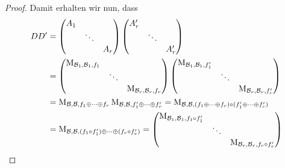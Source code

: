 \documentclass[a4paper,10pt]{scrartcl}
\begin{document}
\begin{proof}
  Damit erhalten wir nun, dass
  \begin{align*}
          D D'
    &=  \begin{pmatrix}
          A_1 &         &     \\
              & \ddots  &     \\
              &         & A_r
        \end{pmatrix}
        \begin{pmatrix}
          A'_r  &         &       \\
                & \ddots  &       \\
                &         & A'_r
        \end{pmatrix}
    \\
    &=  \begin{pmatrix}
          \repmatrix{\basis{B}_1}{\basis{B}_1}{f_1} &         &     \\
                                                    & \ddots  &     \\
                                                    &         & \repmatrix{\basis{B}_r}{\basis{B}_r}{f_r}
        \end{pmatrix}
        \begin{pmatrix}
          \repmatrix{\basis{B}_1}{\basis{B}_1}{f'_1}  &         &     \\
                                                      & \ddots  &     \\
                                                      &         & \repmatrix{\basis{B}_r}{\basis{B}_r}{f'_r}
        \end{pmatrix}
    \\
    &=  \repmatrix{\basis{B}}{\basis{B}}{f_1 \oplus \dotsb \oplus f_r}
        \repmatrix{\basis{B}}{\basis{B}}{f'_1 \oplus \dotsb \oplus f'_r}
      = \repmatrix{\basis{B}}{\basis{B}}{(f_1 \oplus \dotsb \oplus f_r) \circ (f'_1 \oplus \dotsb \oplus f'_r)}
    \\
    &=  \repmatrix{\basis{B}}{\basis{B}}{(f_1 \circ f'_1) \oplus \dotsb \oplus (f_r \circ f'_r)}
     =  \begin{pmatrix}
            \repmatrix{\basis{B}_1}{\basis{B}_1}{f_1 \circ f'_1} 
          & {}
          & {}
          \\
            {}
          & \ddots
          & {}
          \\
            {}
          & {}
          & \repmatrix{\basis{B}_r}{\basis{B}_r}{f_r \circ f'_r}
        \end{pmatrix}
    \\

\end{align*}
\end{proof}
\end{document}
